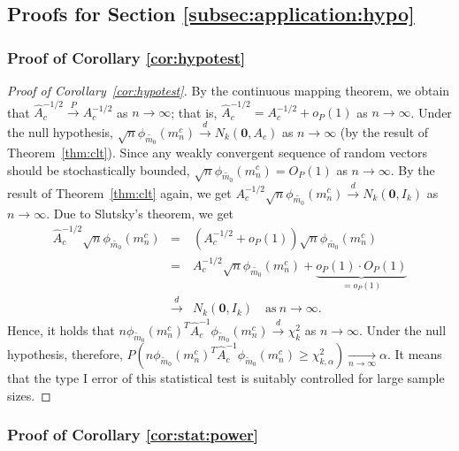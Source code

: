 \documentclass[preprint]{imsart}
\theoremstyle{plain}
\theoremstyle{remark}
\begin{document}
\begin{appendix}
\subsection{Proofs for Section \ref{subsec:application:hypo}}


\subsubsection{Proof of Corollary \ref{cor:hypotest}}
\begin{proof}[Proof of Corollary~\ref{cor:hypotest}]
By the continuous mapping theorem, we obtain that $\hat{A}_{c}^{-1/2} \overset{P}{\rightarrow} A_{c}^{-1/2}$ as $n \rightarrow \infty$; that is, $\hat{A}^{-1/2}_{c}= A^{-1/2}_{c} + o_{P}(1)$ as $n \rightarrow \infty$. Under the null hypothesis, $\sqrt{n} \phi_{\tilde{m_0}}(m^{c}_{n}) \overset{d}{\rightarrow} N_{k}(\mathbf{0}, A_{c})$ as $n \rightarrow \infty$ (by the result of Theorem~\ref{thm:clt}). Since any weakly convergent sequence of random vectors should be stochastically bounded, $\sqrt{n} \phi_{\tilde{m_0}}(m^{c}_{n}) = O_{P}(1)$ as $n\rightarrow \infty$. By the result of Theorem~\ref{thm:clt} again, we get $A^{-1/2}_{c} \sqrt{n} \phi_{\tilde{m_0}}(m^{c}_{n}) \overset{d}{\rightarrow} N_{k}(\mathbf{0}, I_{k})$ as $n\rightarrow \infty$. Due to Slutsky's theorem, we get
\begin{eqnarray*}
\hat{A}^{-1/2}_{c} \sqrt{n} \phi_{\tilde{m_0}}(m^{c}_{n}) 
&=& (A^{-1/2}_{c} + o_{P}(1))\sqrt{n} \phi_{\tilde{m_0}}(m^{c}_{n}) \\
&=& A^{-1/2}_{c} \sqrt{n} \phi_{\tilde{m_0}}(m^{c}_{n}) + \underbrace{o_{P}(1) \cdot O_{P}(1)}_{=o_{P}(1)}  \\ 
& \overset{d}{\rightarrow} & N_{k}(\mathbf{0}, I_{k}) \quad \mbox{as} ~ n \rightarrow \infty.
\end{eqnarray*}
Hence, it holds that $n\phi_{\tilde{m}_0}(m^{c}_{n})^{T} \hat{A}^{-1}_{c}\phi_{\tilde{m}_0}(m^{c}_{n}) \overset{d}{\rightarrow} \chi^{2}_{k}$ as $n \rightarrow \infty$. Under the null hypothesis, therefore, $P(n\phi_{\tilde{m}_0}(m^{c}_{n})^{T} \hat{A}^{-1}_{c}\phi_{\tilde{m}_0}(m^{c}_{n}) \ge \chi^{2}_{k, \alpha}) \underset{n \rightarrow \infty}{\rightarrow} \alpha$. It means that the type I error of this statistical test is suitably controlled for large sample sizes. 
\end{proof}



\subsubsection{Proof of Corollary \ref{cor:stat:power}}



\end{appendix}
\end{document}
